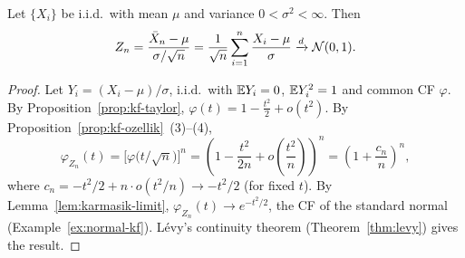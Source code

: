 \documentclass[main.tex]{subfiles}
\begin{document}
\begin{theorem}\label{thm:clt}
Let $\{X_i\}$ be i.i.d.\ with mean $\mu$ and variance $0<\sigma^2<\infty$. Then
\[
Z_n = \frac{\bar{X}_n - \mu}{\sigma/\sqrt{n}}=\frac{1}{\sqrt n}\sum_{i=1}^n\frac{X_i-\mu}{\sigma} \xrightarrow{d} \mathcal{N}(0, 1).
\]
\end{theorem}
\begin{proof}
Let $Y_i=(X_i-\mu)/\sigma$, i.i.d.\ with $\mathbb{E} Y_i=0$, $\mathbb{E} Y_i^2=1$ and common CF $\varphi$. By Proposition~\ref{prop:kf-taylor}, $\varphi(t) = 1 - \frac{t^2}{2} + o(t^2)$. By Proposition~\ref{prop:kf-ozellik}~(3)--(4),
\[
\varphi_{Z_n}(t)=\Big[\varphi\big(t/\sqrt n\big)\Big]^n=\left(1-\frac{t^2}{2n}+o\!\left(\frac{t^2}{n}\right)\right)^n=\left(1+\frac{c_n}{n}\right)^n,
\]
where $c_n=-t^2/2+n\cdot o(t^2/n)\to-t^2/2$ (for fixed $t$). By Lemma~\ref{lem:karmasik-limit}, $\varphi_{Z_n}(t)\to e^{-t^2/2}$, the CF of the standard normal (Example~\ref{ex:normal-kf}). Lévy's continuity theorem (Theorem~\ref{thm:levy}) gives the result.
\end{proof}
\end{document}
